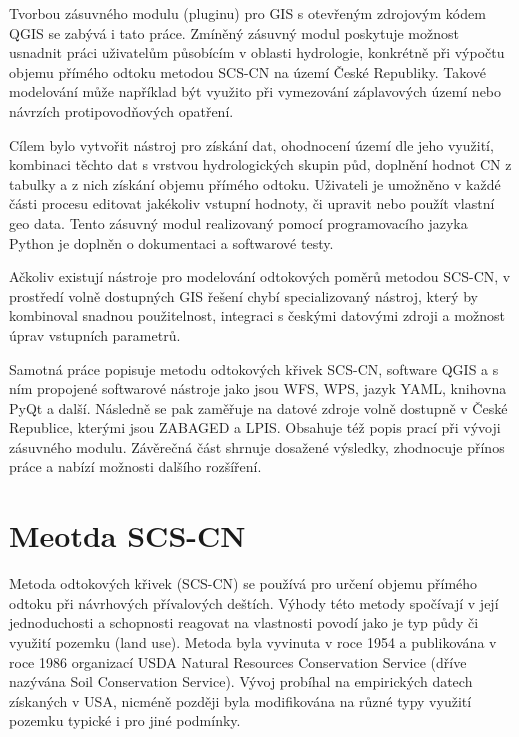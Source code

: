 \documentclass[a4paper,oneside,12pt]{book}
\begin{document}
Tvorbou zásuvného modulu (pluginu) pro GIS s otevřeným zdrojovým kódem QGIS se zabývá i tato práce. Zmíněný zásuvný modul poskytuje možnost usnadnit práci uživatelům působícím v oblasti hydrologie, konkrétně při výpočtu objemu přímého odtoku metodou SCS-CN na území České Republiky. Takové modelování může například být využito při vymezování záplavových území nebo návrzích protipovodňových opatření.

Cílem bylo vytvořit nástroj pro získání dat, ohodnocení území dle jeho využití, kombinaci těchto dat s vrstvou hydrologických skupin půd, doplnění hodnot CN z tabulky a z nich získání objemu přímého odtoku. Uživateli je umožněno v každé části procesu editovat jakékoliv vstupní hodnoty, či upravit nebo použít vlastní geo data. Tento zásuvný modul realizovaný pomocí programovacího jazyka Python je doplněn o dokumentaci a softwarové testy. 

Ačkoliv existují nástroje pro modelování odtokových poměrů metodou SCS-CN, v prostředí volně dostupných GIS řešení chybí specializovaný nástroj, který by kombinoval snadnou použitelnost, integraci s českými datovými zdroji a možnost úprav vstupních parametrů.

Samotná práce popisuje metodu odtokových křivek SCS-CN, software QGIS a s ním propojené softwarové nástroje jako jsou WFS, WPS, jazyk YAML, knihovna PyQt a další. Následně se pak zaměřuje na  datové zdroje volně dostupně v České Republice, kterými jsou ZABAGED a LPIS. Obsahuje též popis prací při vývoji zásuvného modulu. Závěrečná část shrnuje dosažené výsledky, zhodnocuje přínos práce a nabízí možnosti dalšího rozšíření.



\newpage
\chapter{Meotda SCS-CN} \label{SCSCN}
\hspace{10mm} Metoda odtokových křivek (SCS-CN) se používá pro určení objemu přímého odtoku při návrhových přívalových deštích. Výhody této metody spočívají v její jednoduchosti a schopnosti reagovat na vlastnosti povodí jako je typ půdy či využití pozemku (land use). Metoda byla vyvinuta v roce 1954 a publikována v roce 1986 organizací USDA Natural Resources Conservation Service (dříve nazývána Soil Conservation Service). \cite{MNYDGwleJOjKLRUp} Vývoj probíhal na empirických datech získaných v USA, nicméně později byla modifikována na různé typy využití pozemku typické i pro jiné podmínky. \cite{Holman2003}\cite{Lian2020}
\end{document}
